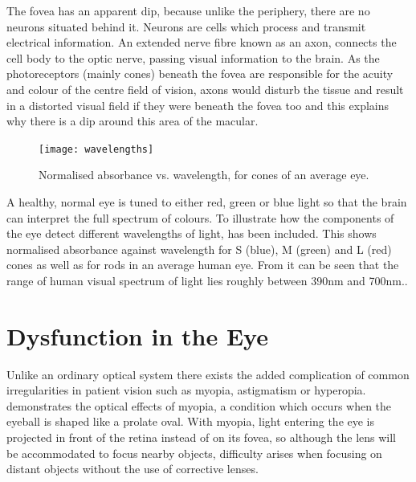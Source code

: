 The fovea has an apparent dip, because unlike the periphery, there are
no neurons situated behind it. Neurons are cells which process and
transmit electrical information. An extended nerve fibre known as an axon,
connects the cell body to the optic nerve, passing visual information to the
brain. As the photoreceptors (mainly cones) beneath the fovea are responsible
for the acuity and colour of the centre field of vision, axons would disturb the
tissue and result in a distorted visual field if they were beneath the fovea too
and this explains why there is a dip around this area of the macular.
 
 \begin{figure}[H]
\centering
  \texttt{[image: wavelengths]}
\caption{Normalised absorbance vs. wavelength, for cones of an average eye.\cite{wikicones}}
\label{fig:wavelengths}
\end{figure}

A healthy, normal eye is tuned to either red, green or blue light so that the
brain can interpret the full spectrum of colours. To illustrate how the
components of the eye detect different wavelengths of light,
 has been included. This shows normalised absorbance
against wavelength for S (blue), M (green) and L (red) cones as well as for rods in an average human eye.  From
 it can be seen that the range of human visual spectrum
of light lies roughly between 390nm and 700nm.\cite{starr2010biology}.


\section{Dysfunction in the Eye}

Unlike an ordinary optical system there exists the added complication
of common irregularities in patient vision such as myopia, astigmatism
or hyperopia.  demonstrates the optical effects of myopia,
a condition which occurs when the eyeball is shaped like a prolate oval.
\cite{saine2002ophthalmic} With myopia, light entering the eye is projected
in front of the retina instead of on its fovea, so although the lens will be
accommodated to focus nearby objects, difficulty arises when focusing on 
distant objects without the use of corrective lenses.

